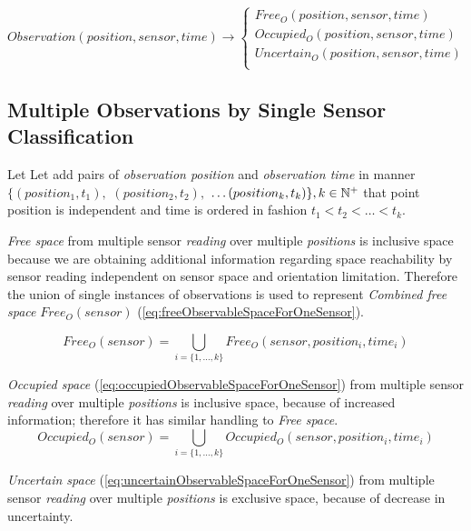     \begin{equation}\label{eq:observationClassification}
        Observation(position,sensor,time)\to
        \begin{cases}
            Free_O(position,sensor,time)\\
            Occupied_O(position,sensor,time)\\
            Uncertain_O(position,sensor,time)\\
        \end{cases}
    \end{equation}


\subsection{Multiple Observations by Single Sensor Classification}\label{multipleObservationsBySingleSensor}
    \noindent Let Let add pairs of \emph{observation position} and \emph{observation time} in manner $\{(position_1,t_1),$ $(position_2,t_2),$ $\dots(position_k,t_k)\}, k\in\mathbb{N}^+$ that point position is independent and time is ordered in fashion $t_1 < t_2 < \dots < t_k$.
 
 
    \emph{Free space} from multiple sensor \emph{reading} over multiple \emph{positions} is inclusive space because we are obtaining additional information regarding space reachability by sensor reading independent on sensor space and orientation limitation. Therefore the union of single instances of observations is used to represent \emph{Combined free space} $Free_O(sensor)$ (\ref{eq:freeObservableSpaceForOneSensor}).

    \begin{equation}\label{eq:freeObservableSpaceForOneSensor}
        Free_O(sensor)= \bigcup_{i=\{1,\dots,k\}}Free_O(sensor,position_i,time_i)
    \end{equation}
 
    \emph{Occupied space} (\ref{eq:occupiedObservableSpaceForOneSensor}) from multiple sensor \emph{reading} over multiple \emph{positions} is inclusive space, because of increased information; therefore it has similar handling to \emph{Free space}.
    \begin{equation}\label{eq:occupiedObservableSpaceForOneSensor}
        Occupied_O(sensor)= \bigcup_{i=\{1,\dots,k\}}Occupied_O(sensor,position_i,time_i)
    \end{equation}
 
    \emph{Uncertain space} (\ref{eq:uncertainObservableSpaceForOneSensor}) from multiple sensor \emph{reading} over multiple \emph{positions} is exclusive space, because of decrease in uncertainty. 
 
